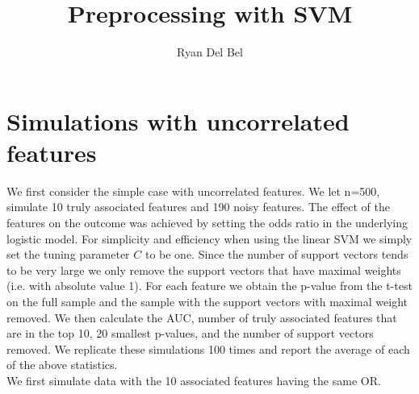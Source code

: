 \documentclass{article}\usepackage[]{graphicx}\usepackage[]{color}
\title{Preprocessing with SVM}
\author{Ryan Del Bel}
\begin{document}
\maketitle












\section{Simulations with uncorrelated features}

We first consider the simple case with uncorrelated features. We let n=500, simulate 10 truly associated features and 190 noisy features. The effect of the features on the outcome was achieved by setting the odds ratio in the underlying logistic model. For simplicity and efficiency when using the linear SVM we simply set the tuning parameter $C$ to be one. Since the number of support vectors tends to be very large we only remove the support vectors that have maximal weights (i.e. with absolute value 1). For each feature we obtain the p-value from the t-test on the full sample and the sample with the support vectors with maximal weight removed. We then calculate the AUC, number of truly associated features that are in the top 10, 20 smallest p-values, and the number of support vectors removed. We replicate these simulations 100 times and report the average of each of the above statistics. \\

We first simulate data with the 10 associated features having the same OR.
\end{document}
